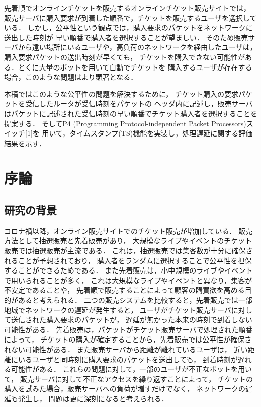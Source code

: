 \documentclass[a4j,11pt]{jreport}
\author{羽田秀平}
\begin{document}
\maketitle
{}
先着順でオンラインチケットを販売するオンラインチケット販売サイトでは，
販売サーバに購入要求が到着した順番で，チケットを販売するユーザを選択している．
しかし，公平性という観点では，購入要求のパケットをネットワークに送出した時刻が
早い順番で購入者を選択することが望ましい．
そのため販売サーバから遠い場所にいるユーザや，高負荷のネットワークを経由したユーザは，
購入要求パケットの送出時刻が早くても，
チケットを購入できない可能性がある．とくに大量のボットを用いて自動でチケットを
購入するユーザが存在する場合，このような問題はより顕著となる．

本稿ではこのような公平性の問題を解決するために，
チケット購入の要求パケットを受信したルータが受信時刻をパケットの
ヘッダ内に記述し，販売サーバはパケットに記述された受信時刻の早い順番でチケット購入者を選択することを提案する．
そしてP4 (Programming Protocol-independent Packet Processors)スイッチ[1]を
用いて，タイムスタンプ(TS)機能を実装し，処理遅延に関する評価結果を示す．

\tableofcontents

\chapter{序論}
\section{研究の背景}
コロナ禍以降，オンライン販売サイトでのチケット販売が増加している．
販売方法として抽選販売と先着販売があり，
大規模なライブやイベントのチケット販売では抽選販売が主流である．
これは，抽選販売では集客数が十分に確保されることが予想されており，
購入者をランダムに選択することで公平性を担保することができるためである．
また先着販売は，小中規模のライブやイベントで用いられることが多く，
これは大規模なライブやイベントと異なり，集客が不安定であることや，
先着順で販売することによって顧客の購買欲を高める目的があると考えられる．
二つの販売システムを比較すると，先着販売では一部地域でネットワークの遅延が発生すると，
ユーザがチケット販売サーバに対して送信された購入要求のパケットが，
遅延が無かった本来の時刻で到着しない可能性がある．
先着販売は，パケットがチケット販売サーバで処理された順番によって，
チケットの購入が確定することから，先着販売では公平性が確保されない可能性がある．
また販売サーバから距離が離れているユーザは，
近い距離にいるユーザと同時刻に購入要求のパケットを送出しても，
到着時刻が遅れる可能性がある．
これらの問題に対して，一部のユーザが不正なボットを用いて，
販売サーバに対して不正なアクセスを繰り返すことによって，
チケットの購入を試みた場合，販売サーバへの負荷が増すだけでなく，
ネットワークの遅延も発生し，
問題は更に深刻になると考えられる．
\end{document}
